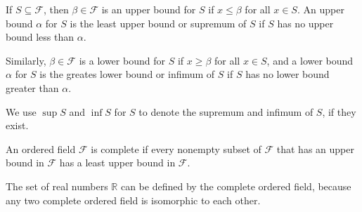 \documentclass[../main.tex]{subfiles}
\begin{document}
\begin{defn} \label{def:sup}
    If $S \subseteq \mathcal{F}$, then $\beta \in \mathcal{F}$ is an \textsf{upper bound} for $S$ if $x \leq \beta$ for all $x \in S$.
    An upper bound $\alpha$ for $S$ is the \textsf{least upper bound} or \textsf{supremum} of $S$ if $S$ has no upper bound less than $\alpha$.
    
    Similarly, $\beta \in \mathcal{F}$ is a \textsf{lower bound} for $S$ if $x \geq \beta$ for all $x \in S$, and a lower bound $\alpha$ for $S$ is the \textsf{greates lower bound} or \textsf{infimum} of $S$ if $S$ has no lower bound greater than $\alpha$.

    We use $\sup S$ and $\inf S$ for $S$ to denote the supremum and infimum of $S$, if they exist.
\end{defn}

\begin{ax} \label{ax:comp}
    An ordered field $\mathcal F$ is \textsf{complete} if every nonempty subset of $\mathcal F$ that has an upper bound in $\mathcal F$ has a least upper bound in $\mathcal F$.
\end{ax}

The set of real numbers $\mathbb R$ can be defined by the \textsf{complete ordered field}, because any two complete ordered field is isomorphic to each other.
\end{document}
